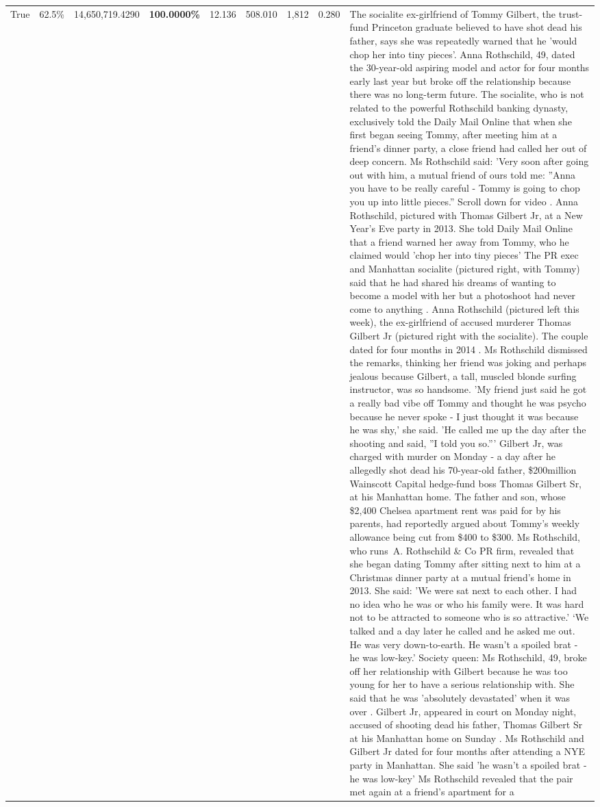 \begin{table}[H]
\begin{tabular}{lllrlllll}
True & 62.5\% & 14,650,719.4290 & \bfseries \color{red} 100.0000\% & 12.136 & 508.010 & 1,812 & 0.280 & The socialite ex-girlfriend of Tommy Gilbert, the trust-fund Princeton graduate believed to have shot dead his father, says she was repeatedly warned that he 'would chop her into tiny pieces'. Anna Rothschild, 49, dated the 30-year-old aspiring model and actor for four months early last year but broke off the relationship because there was no long-term future. The socialite, who is not related to the powerful Rothschild banking dynasty, exclusively told the Daily Mail Online that when she first began seeing Tommy, after meeting him at a friend's dinner party, a close friend had called her out of deep concern. Ms Rothschild said: 'Very soon after going out with him, a mutual friend of ours told me: ''Anna you have to be really careful - Tommy is going to chop you up into little pieces.'' Scroll down for video . Anna Rothschild, pictured with Thomas Gilbert Jr, at a New Year's Eve party in 2013. She told Daily Mail Online that a friend warned her away from Tommy, who he claimed would 'chop her into tiny pieces' The PR exec and Manhattan socialite (pictured right, with Tommy) said that he had shared his dreams of wanting to become a model with her but a photoshoot had never come to anything . Anna Rothschild (pictured left this week), the ex-girlfriend of accused murderer Thomas Gilbert Jr (pictured right with the socialite). The couple dated for four months in 2014 . Ms Rothschild dismissed the remarks, thinking her friend was joking and perhaps jealous because Gilbert, a tall, muscled blonde surfing instructor, was so handsome. 'My friend just said he got a really bad vibe off Tommy and thought he was psycho because he never spoke - I just thought it was because he was shy,' she said. 'He called me up the day after the shooting and said, ''I told you so.''' Gilbert Jr, was charged with murder on Monday - a day after he allegedly shot dead his 70-year-old father, \$200million Wainscott Capital hedge-fund boss Thomas Gilbert Sr, at his Manhattan home. The father and son, whose \$2,400 Chelsea apartment rent was paid for by his parents, had reportedly argued about Tommy's weekly allowance being cut from \$400 to \$300. Ms Rothschild, who runs A. Rothschild \& Co PR firm, revealed that she began dating Tommy after sitting next to him at a Christmas dinner party at a mutual friend's home in 2013. She said: 'We were sat next to each other. I had no idea who he was or who his family were. It was hard not to be attracted to someone who is so attractive.' ‘We talked and a day later he called and he asked me out. He was very down-to-earth. He wasn’t a spoiled brat - he was low-key.’ Society queen: Ms Rothschild, 49, broke off her relationship with Gilbert because he was too young for her to have a serious relationship with. She said that he was 'absolutely devastated' when it was over . Gilbert Jr, appeared in court on Monday night, accused of shooting dead his father, Thomas Gilbert Sr at his Manhattan home on Sunday . Ms Rothschild and Gilbert Jr dated for four months after attending a NYE party in Manhattan. She said 'he wasn't a spoiled brat - he was low-key' Ms Rothschild revealed that the pair met again at a friend’s apartment for a 
\end{tabular}
\end{table}
